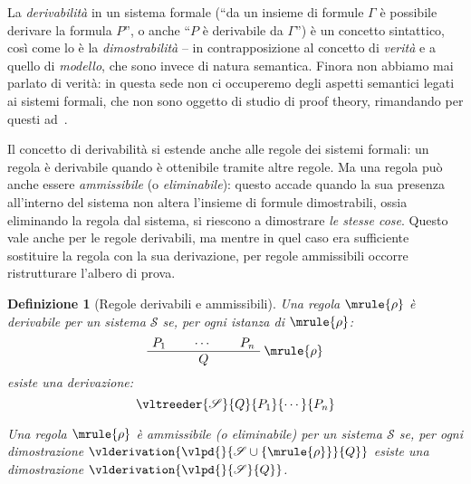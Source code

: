 \documentclass[12pt,a4paper,openright,twoside]{report}
\newtheorem{dfn}[thm]{Definizione}
\begin{document}
La \emph{derivabilit\`a} in un sistema formale (``da un insieme di formule $\Gamma$ \`e possibile derivare la formula $P$'', o anche ``$P$ \`e derivabile da $\Gamma$'') \`e un concetto sintattico, cos\`i come lo \`e la \emph{dimostrabilit\`a} -- in contrapposizione al concetto di \emph{verit\`a} e a quello di \emph{modello}, che sono invece di natura semantica. Finora non abbiamo mai parlato di verit\`a: in questa sede non ci occuperemo degli aspetti semantici legati ai sistemi formali, che non sono oggetto di studio di proof theory, rimandando per questi ad~\cite{Abr92, Bar77, Cha73}.

Il concetto di derivabilit\`a si estende anche alle regole dei sistemi formali: un regola \`e derivabile quando \`e ottenibile tramite altre regole. Ma una regola pu\`o anche essere \emph{ammissibile} (o \emph{eliminabile}): questo accade quando la sua presenza all'interno del sistema non altera l'insieme di formule dimostrabili, ossia eliminando la regola dal sistema, si riescono a dimostrare \emph{le stesse cose}. Questo vale anche per le regole derivabili, ma mentre in quel caso era sufficiente sostituire la regola con la sua derivazione, per regole ammissibili occorre ristrutturare l'albero di prova.

\begin{dfn}[Regole derivabili e ammissibili]
Una regola $\mrule{\rho}$ \`e \emph{derivabile} per un sistema $\mathscr{S}$ se, per ogni istanza di $\mrule{\rho}$:
$$
	\AxiomC{$P_1$}
	\AxiomC{$\cdots$}
	\AxiomC{$P_n$}
	\RightLabel{$\mrule{\rho}$}
	\TrinaryInfC{$Q$}
	\DisplayProof{}
$$
esiste una derivazione:
$$
	\vltreeder{\mathscr{S}}{Q}{P_1}{\cdots}{P_n}
$$

Una regola $\mrule{\rho}$ \`e \emph{ammissibile} (o \emph{eliminabile}) per un sistema $\mathscr{S}$ se, per ogni dimostrazione $\vlderivation{\vlpd{}{\mathscr{S}\cup\{\mrule{\rho}\}}{Q}}$ esiste una dimostrazione $\vlderivation{\vlpd{}{\mathscr{S}}{Q}}$.
\end{dfn}
\end{document}
